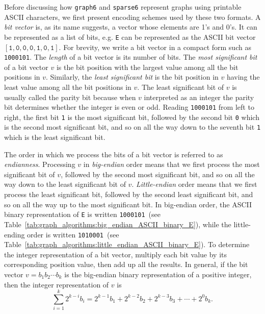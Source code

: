 Before discussing how {\tt graph6} and {\tt sparse6} represent graphs using
printable ASCII characters, we first present encoding schemes used by
these two formats. A \emph{bit vector} is, as its name suggests, a
vector whose elements are 1's and 0's. It can be represented as a list
of bits, e.g. \verb!E! can be represented as the ASCII bit vector
$[\texttt{1}, \texttt{0}, \texttt{0}, \texttt{0}, \texttt{1},
  \texttt{0}, \texttt{1}]$. For brevity, we write a bit vector in a
compact form such as \texttt{1000101}. The \emph{length} of a bit
vector is its number of bits. The \emph{most significant bit}
of a bit vector $v$ is the bit position with the largest value among
all the bit positions in $v$. Similarly, the
\emph{least significant bit} is the bit position in $v$ having the
least value among all the bit positions in $v$. The least significant
bit of $v$ is usually called the parity bit because when $v$
interpreted as an integer the parity bit determines whether the
integer is even or odd. Reading \texttt{1000101} from left to right,
the first bit \texttt{1} is the most significant bit, followed by the
second bit \texttt{0} which is the second most significant bit, and so
on all the way down to the seventh bit \texttt{1} which is the least
significant bit.

The order in which we process the bits of a bit vector is referred to
as \emph{endianness}. Processing $v$ in \emph{big-endian} order means
that we first process the most significant bit of $v$, followed by the
second most significant bit, and so on all the way down to the least
significant bit of $v$. \emph{Little-endian} order means that we first
process the least significant bit, followed by the second least
significant bit, and so on all the way up to the most significant
bit. In big-endian order, the ASCII binary representation of
\texttt{E} is written \texttt{1000101}~(see
Table~\ref{tab:graph_algorithms:big_endian_ASCII_binary_E}), while
the little-ending order is written \texttt{1010001}~(see
Table~\ref{tab:graph_algorithms:little_endian_ASCII_binary_E}). To
determine the integer representation of a bit vector, multiply each
bit value by its corresponding position value, then add up all the
results. In general, if the bit vector $v = b_1 b_2 \cdots b_k$ is the
big-endian binary representation of a positive integer, then the
integer representation of $v$ is
%
\begin{equation}
\label{eq:graph_algorithms:big_endian_binary_to_integer}
\sum_{i=1}^k 2^{k-i} b_i
=
2^{k-1} b_1 + 2^{k-2} b_2 + 2^{k-3} b_3 + \cdots + 2^0 b_k.
\end{equation}

